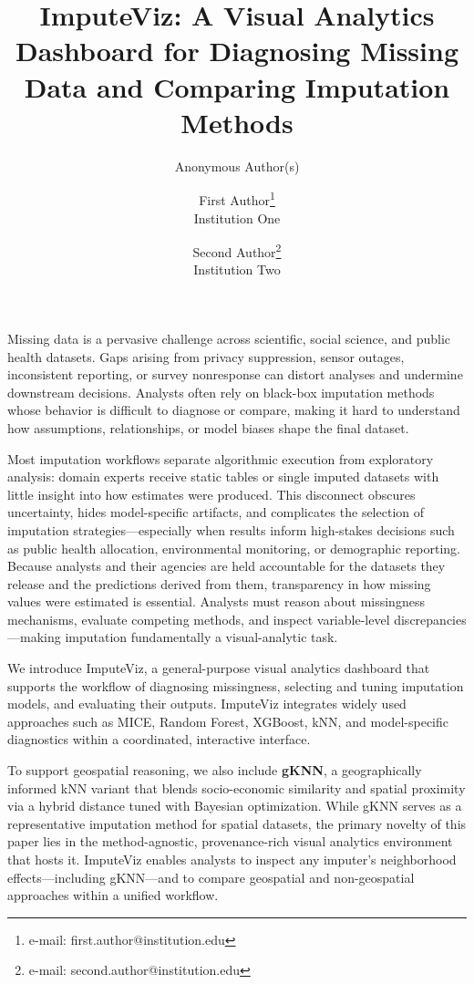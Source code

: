 \documentclass[review]{vgtc}
\title{ImputeViz: A Visual Analytics Dashboard for Diagnosing Missing Data and Comparing Imputation Methods}
\author{Anonymous Author(s)}
\author{
  First Author\thanks{e-mail: first.author@institution.edu}\\
  \scriptsize Institution One
\and
  Second Author\thanks{e-mail: second.author@institution.edu}\\
  \scriptsize Institution Two
}
\begin{document}

\maketitle

\ifshortpaper

\else
\label{sec:introduction}
Missing data is a pervasive challenge across scientific, social science, and public health datasets. Gaps arising from privacy suppression, sensor outages, inconsistent reporting, or survey nonresponse can distort analyses and undermine downstream decisions. Analysts often rely on black-box imputation methods whose behavior is difficult to diagnose or compare, making it hard to understand how assumptions, relationships, or model biases shape the final dataset.

Most imputation workflows separate algorithmic execution from exploratory analysis: domain experts receive static tables or single imputed datasets with little insight into how estimates were produced. This disconnect obscures uncertainty, hides model-specific artifacts, and complicates the selection of imputation strategies---especially when results inform high-stakes decisions such as public health allocation, environmental monitoring, or demographic reporting. Because analysts and their agencies are held accountable for the datasets they release and the predictions derived from them, transparency in how missing values were estimated is essential. Analysts must reason about missingness mechanisms, evaluate competing methods, and inspect variable-level discrepancies---making imputation fundamentally a visual-analytic task.

We introduce ImputeViz, a general-purpose visual analytics dashboard that supports the workflow of diagnosing missingness, selecting and tuning imputation models, and evaluating their outputs. ImputeViz integrates widely used approaches such as MICE, Random Forest, XGBoost, kNN, and model-specific diagnostics within a coordinated, interactive interface.

To support geospatial reasoning, we also include \textbf{gKNN}, a geographically informed kNN variant that blends socio-economic similarity and spatial proximity via a hybrid distance tuned with Bayesian optimization. While gKNN serves as a representative imputation method for spatial datasets, the primary novelty of this paper lies in the method-agnostic, provenance-rich visual analytics environment that hosts it. ImputeViz enables analysts to inspect any imputer's neighborhood effects---including gKNN---and to compare geospatial and non-geospatial approaches within a unified workflow.
\end{document}
